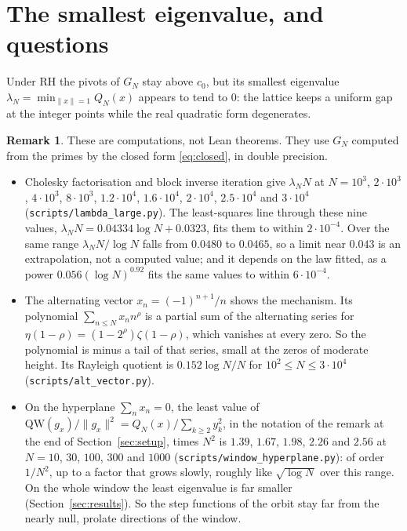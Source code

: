 \documentclass[11pt]{article}
\theoremstyle{definition}
\newtheorem*{remark}{Remark}
\begin{document}
\section{The smallest eigenvalue, and questions}\label{sec:lambda}

Under RH the pivots of $G_N$ stay above $c_0$, but its smallest eigenvalue $\lambda_N = \min_{\|x\| = 1} Q_N(x)$
appears to tend
to $0$: the lattice keeps a uniform gap at the integer points while the real quadratic form degenerates.

\begin{remark}
These are computations, not Lean theorems. They use $G_N$ computed from the primes by the closed form
\eqref{eq:closed}, in double precision.
\begin{itemize}
\item Cholesky factorisation and block inverse iteration give $\lambda_N N$ at $N = 10^3$, $2 \cdot 10^3$, $4 \cdot
10^3$, $8 \cdot 10^3$, $1.2 \cdot 10^4$, $1.6 \cdot 10^4$, $2 \cdot 10^4$, $2.5 \cdot 10^4$ and $3 \cdot 10^4$
(\texttt{scripts/lambda\_large.py}). The least-squares line through these nine values, $\lambda_N N = 0.04334 \log N +
0.0323$, fits them to within $2 \cdot 10^{-4}$. Over the same range $\lambda_N N/\log N$ falls
from $0.0480$ to $0.0465$, so a limit near $0.043$ is an extrapolation, not a computed value; and it depends on the law
fitted, as a power $0.056(\log N)^{0.92}$ fits the same values to within $6 \cdot 10^{-4}$.
\item The alternating vector $x_n = (-1)^{n + 1}/n$ shows the mechanism. Its polynomial $\sum_{n \le N} x_n n^\rho$ is a
partial sum of the alternating series for $\eta(1 - \rho) = (1 - 2^\rho)\zeta(1 - \rho)$, which vanishes at every zero.
So the polynomial is minus a tail of that series, small at the zeros of moderate height. Its Rayleigh quotient is $0.152
\log N/N$ for $10^2 \le N \le 3 \cdot 10^4$ (\texttt{scripts/alt\_vector.py}).
\item On the hyperplane $\sum_n x_n = 0$, the least value of $\mathrm{QW}(g_x)/\|g_x\|^2 = Q_N(x)/\sum_{k \ge 2} y_k^2$,
in the notation of the remark at the end of Section~\ref{sec:setup}, times $N^2$ is $1.39$, $1.67$, $1.98$, $2.26$ and
$2.56$ at $N = 10$, $30$, $100$, $300$ and $1000$ (\texttt{scripts/window\_hyperplane.py}): of order $1/N^2$, up to a
factor that grows slowly, roughly like $\sqrt{\log N}$ over this
range. On the whole window the least eigenvalue is far smaller
(Section~\ref{sec:results}). So the step functions of the orbit stay far from the nearly null, prolate directions of the
window.
\end{itemize}
\end{remark}
\end{document}
